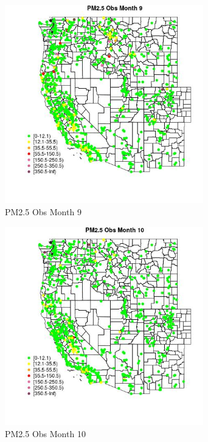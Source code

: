 \begin{figure} 
\centering  
\includegraphics[width=0.77\textwidth]{Code_Outputs/Report_ML_input_PM25_Step4_part_f_de_duplicated_aveswNAs_MapObsMo9PM25_Obs.jpg} 
\caption{\label{fig:Report_ML_input_PM25_Step4_part_f_de_duplicated_aveswNAsMapObsMo9PM25_Obs}PM2.5 Obs Month 9} 
\end{figure} 
 

\clearpage 

\begin{figure} 
\centering  
\includegraphics[width=0.77\textwidth]{Code_Outputs/Report_ML_input_PM25_Step4_part_f_de_duplicated_aveswNAs_MapObsMo10PM25_Obs.jpg} 
\caption{\label{fig:Report_ML_input_PM25_Step4_part_f_de_duplicated_aveswNAsMapObsMo10PM25_Obs}PM2.5 Obs Month 10} 
\end{figure} 
 

